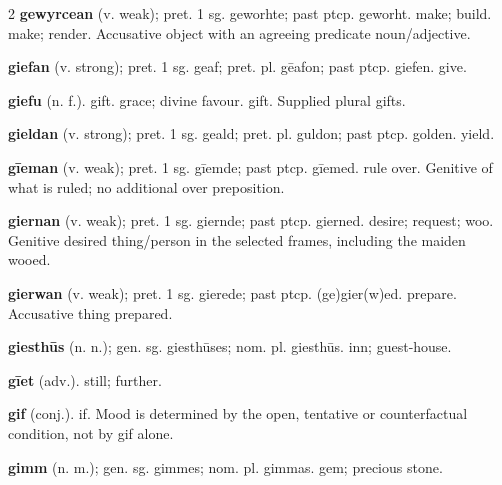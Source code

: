 \begin{multicols*}{2}
\textbf{gewyrcean} (v. weak); pret. 1 sg. geworhte; past ptcp. geworht. make; build. make; render. Accusative object with an agreeing predicate noun/adjective.\par
\textbf{giefan} (v. strong); pret. 1 sg. geaf; pret. pl. gēafon; past ptcp. giefen. give.\par
\textbf{giefu} (n. f.). gift. grace; divine favour. gift. Supplied plural gifts.\par
\textbf{gieldan} (v. strong); pret. 1 sg. geald; pret. pl. guldon; past ptcp. golden. yield.\par
\textbf{gīeman} (v. weak); pret. 1 sg. gīemde; past ptcp. gīemed. rule over. Genitive of what is ruled; no additional over preposition.\par
\textbf{giernan} (v. weak); pret. 1 sg. giernde; past ptcp. gierned. desire; request; woo. Genitive desired thing/person in the selected frames, including the maiden wooed.\par
\textbf{gierwan} (v. weak); pret. 1 sg. gierede; past ptcp. (ge)gier(w)ed. prepare. Accusative thing prepared.\par
\textbf{giesthūs} (n. n.); gen. sg. giesthūses; nom. pl. giesthūs. inn; guest-house.\par
\textbf{gīet} (adv.). still; further.\par
\textbf{gif} (conj.). if. Mood is determined by the open, tentative or counterfactual condition, not by gif alone.\par
\textbf{gimm} (n. m.); gen. sg. gimmes; nom. pl. gimmas. gem; precious stone.\par

\end{multicols*}
